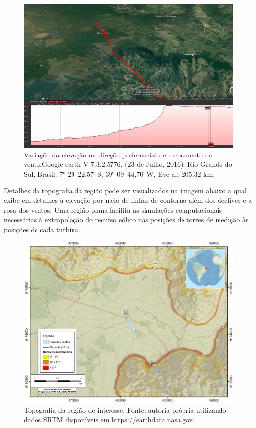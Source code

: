 \documentclass[
	12pt,				%
	openright,			%
	oneside,			%
	a4paper,			%
	english,			%
	french,				%
	spanish,			%
	brazil				%
	]{abntex2}
\begin{document}
\begin{figure}[h]
    \centering
	\includegraphics[width=\textwidth]{elevation2}
	\caption{Variação da elevação na direção preferencial de escoamento do vento.\newline Google earth V 7.3.2.5776. (23 de Julho, 2016). Rio Grande do Sul, Brasil. \ang{7} 29\textquotesingle\ 22,57\textquotesingle\textquotesingle\ S, \ang{39} 09\textquotesingle\ 44,70\textquotesingle\textquotesingle\ W, Eye alt 205,32 km.}
\end{figure}
\FloatBarrier

Detalhes da topografia da região pode ser visualizados na imagem abaixo a qual exibe em detalhes a elevação por meio de linhas de contorno além dos declives e a rosa dos ventos. Uma região plana facilita as simulações computacionais necessárias à extrapolação do recurso eólico nas posições de torres de medição às posições de cada turbina. 

\begin{figure}[h]
    \centering
	\includegraphics[width=\textwidth]{arcmap}
	\caption{Topografia da região de interesse. Fonte: autoria própria utilizando dados SRTM disponíveis em \url{https://earthdata.nasa.gov}.}
\end{figure}
\FloatBarrier
\end{document}
